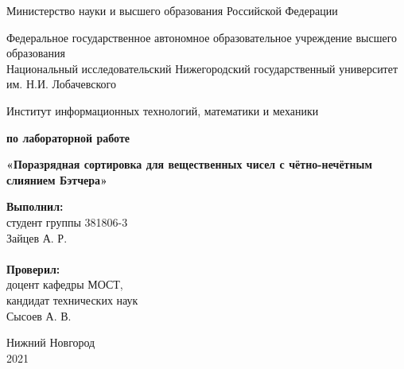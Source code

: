 \documentclass{report}
\begin{document}
\begin{titlepage}

\begin{center}
Министерство науки и высшего образования Российской Федерации
\end{center}

\begin{center}
Федеральное государственное автономное образовательное учреждение высшего образования \\
Национальный исследовательский Нижегородский государственный университет им. Н.И. Лобачевского
\end{center}

\begin{center}
Институт информационных технологий, математики и механики
\end{center}

\vspace{4em}

\begin{center}
\textbf{ по лабораторной работе} \\
\end{center}
\begin{center}
\textbf{\Large«Поразрядная сортировка для вещественных чисел с чётно-нечётным слиянием Бэтчера»} \\
\end{center}

\vspace{4em}

\newbox{\lbox}
\newlength{\maxl}
\setlength{\maxl}{\wd\lbox}
\hfill\parbox{7cm}{
\hspace*{5cm}\hspace*{-5cm}\textbf{Выполнил:} \\ студент группы 381806-3 \\ Зайцев А. Р.\\
\\
\hspace*{5cm}\hspace*{-5cm}\textbf{Проверил:}\\ доцент кафедры МОСТ, \\ кандидат технических наук \\ Сысоев А. В.\\
}
\vspace{\fill}

\begin{center}
Нижний Новгород \\ 2021
\end{center}

\end{titlepage}
\end{document}

